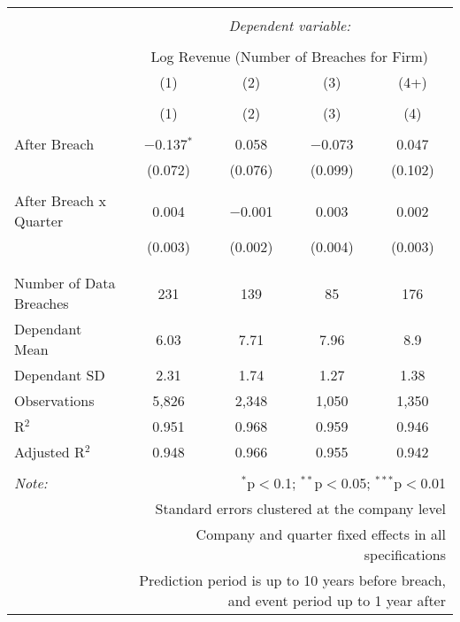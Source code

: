 
\begin{table}[!htbp] \centering 
  \caption{} 
  \label{} 
\begin{tabular}{@{\extracolsep{5pt}}lcccc} 
\\[-1.8ex]\hline 
\hline \\[-1.8ex] 
 & \multicolumn{4}{c}{\textit{Dependent variable:}} \\ 
\cline{2-5} 
\\[-1.8ex] & \multicolumn{4}{c}{Log Revenue (Number of Breaches for Firm)} \\ 
 & (1) & (2) & (3) & (4+) \\ 
\\[-1.8ex] & (1) & (2) & (3) & (4)\\ 
\hline \\[-1.8ex] 
 After Breach & $-$0.137$^{*}$ & 0.058 & $-$0.073 & 0.047 \\ 
  & (0.072) & (0.076) & (0.099) & (0.102) \\ 
  & & & & \\ 
 After Breach x Quarter & 0.004 & $-$0.001 & 0.003 & 0.002 \\ 
  & (0.003) & (0.002) & (0.004) & (0.003) \\ 
  & & & & \\ 
\hline \\[-1.8ex] 
Number of Data Breaches  & 231 & 139 & 85 & 176 \\ 
Dependant Mean & 6.03 & 7.71 & 7.96 & 8.9 \\ 
Dependant SD & 2.31 & 1.74 & 1.27 & 1.38 \\ 
Observations & 5,826 & 2,348 & 1,050 & 1,350 \\ 
R$^{2}$ & 0.951 & 0.968 & 0.959 & 0.946 \\ 
Adjusted R$^{2}$ & 0.948 & 0.966 & 0.955 & 0.942 \\ 
\hline 
\hline \\[-1.8ex] 
\textit{Note:}  & \multicolumn{4}{r}{$^{*}$p$<$0.1; $^{**}$p$<$0.05; $^{***}$p$<$0.01} \\ 
 & \multicolumn{4}{r}{Standard errors clustered at the company level} \\ 
 & \multicolumn{4}{r}{Company and quarter fixed effects in all specifications} \\ 
 & \multicolumn{4}{r}{Prediction period is up to 10 years before breach, and event period up to 1 year after} \\ 
\end{tabular} 
\end{table} 

